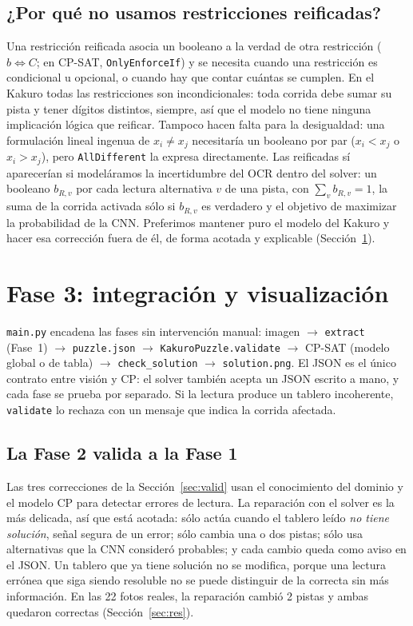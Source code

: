 \documentclass[conference,a4paper]{IEEEtran}
\begin{document}
\subsection{¿Por qué no usamos restricciones reificadas?}
Una restricción reificada asocia un booleano a la verdad de otra restricción ($b\Leftrightarrow C$; en CP-SAT, \texttt{OnlyEnforceIf})
y se necesita cuando una restricción es condicional u opcional, o cuando hay que contar cuántas se cumplen. En el Kakuro todas las
restricciones son incondicionales: toda corrida debe sumar su pista y tener dígitos distintos, siempre, así que el modelo no tiene ninguna
implicación lógica que reificar. Tampoco hacen falta para la desigualdad: una formulación lineal ingenua de $x_i\neq x_j$ necesitaría un
booleano por par ($x_i<x_j$ o $x_i>x_j$), pero \texttt{AllDifferent} la expresa directamente. Las reificadas sí aparecerían si
modeláramos la incertidumbre del OCR dentro del solver: un booleano $b_{R,v}$ por cada lectura alternativa $v$ de una pista, con
$\sum_v b_{R,v}=1$, la suma de la corrida activada sólo si $b_{R,v}$ es verdadero y el objetivo de maximizar la probabilidad de la CNN.
Preferimos mantener puro el modelo del Kakuro y hacer esa corrección fuera de él, de forma acotada y explicable (Sección~\ref{sec:fase3}).

\section{Fase 3: integración y visualización}\label{sec:fase3}
\texttt{main.py} encadena las fases sin intervención manual: imagen $\rightarrow$ \texttt{extract} (Fase~1) $\rightarrow$
\texttt{puzzle.json} $\rightarrow$ \texttt{KakuroPuzzle.validate} $\rightarrow$ CP-SAT (modelo global o de tabla) $\rightarrow$
\texttt{check\_solution} $\rightarrow$ \texttt{solution.png}. El JSON es el único contrato entre visión y CP: el solver también acepta
un JSON escrito a mano, y cada fase se prueba por separado. Si la lectura produce un tablero incoherente, \texttt{validate} lo rechaza
con un mensaje que indica la corrida afectada.

\subsection{La Fase 2 valida a la Fase 1}
Las tres correcciones de la Sección~\ref{sec:valid} usan el conocimiento del dominio y el modelo CP para detectar errores de lectura.
La reparación con el solver es la más delicada, así que está acotada: sólo actúa cuando el tablero leído \emph{no tiene solución}, señal
segura de un error; sólo cambia una o dos pistas; sólo usa alternativas que la CNN consideró probables; y cada cambio queda como aviso en
el JSON. Un tablero que ya tiene solución no se modifica, porque una lectura errónea que siga siendo resoluble no se puede distinguir de
la correcta sin más información. En las 22 fotos reales, la reparación cambió 2 pistas y ambas quedaron correctas (Sección~\ref{sec:res}).
\end{document}
